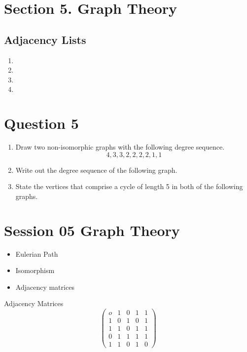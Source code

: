 \documentclass[]{report}
\begin{document}
\section*{Section 5. Graph Theory}

\subsection*{Adjacency Lists}
\begin{enumerate}
\item
\item
\item
\item
\end{enumerate}







\section*{Question 5}
\begin{enumerate}
\item Draw two non-isomorphic graphs with the following degree sequence.
\[ 4,3,3,2,2,2,2,1,1\]
\item Write out the degree sequence of the following graph.
\item State the vertices that comprise a cycle of length 5 in both of the following graphs.
%
\end{enumerate}




\section*{Session 05 Graph Theory}
\begin{itemize}
\item Eulerian Path
\item Isomorphism
\item Adjacency matrices
\end{itemize}
Adjacency Matrices
\[ \left( \begin{matrix}
o & 1 & 0 & 1 & 1 \\ 
1 & 0 & 1 & 0 & 1 \\ 
1 & 1 & 0 & 1 & 1 \\ 
0 & 1 & 1 & 1 & 1 \\ 
1 & 1 & 0 & 1 & 0
\end{matrix} \right) \]
\end{document}
